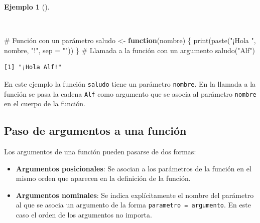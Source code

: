 \documentclass[
  a4paper,
]{scrreport}
\newenvironment{Shaded}{\begin{snugshade}}{\end{snugshade}}
\newcommand{\AttributeTok}[1]{\textcolor[rgb]{0.40,0.45,0.13}{#1}}
\newcommand{\CommentTok}[1]{\textcolor[rgb]{0.37,0.37,0.37}{#1}}
\newcommand{\ControlFlowTok}[1]{\textcolor[rgb]{0.00,0.23,0.31}{\textbf{#1}}}
\newcommand{\FunctionTok}[1]{\textcolor[rgb]{0.28,0.35,0.67}{#1}}
\newcommand{\NormalTok}[1]{\textcolor[rgb]{0.00,0.23,0.31}{#1}}
\newcommand{\OtherTok}[1]{\textcolor[rgb]{0.00,0.23,0.31}{#1}}
\newcommand{\StringTok}[1]{\textcolor[rgb]{0.13,0.47,0.30}{#1}}
\providecommand{\tightlist}{%
  \setlength{\itemsep}{0pt}\setlength{\parskip}{0pt}}\usepackage{longtable,booktabs,array}
\theoremstyle{definition}
\theoremstyle{definition}
\newtheorem{example}{Ejemplo}[chapter]
\theoremstyle{remark}
\begin{document}
\begin{example}[]\protect\hypertarget{exm-funcion-con-parametros}{}\label{exm-funcion-con-parametros}

~

\begin{Shaded}
\begin{Highlighting}[]
\CommentTok{\# Función con un parámetro}
\NormalTok{saludo }\OtherTok{\textless{}{-}} \ControlFlowTok{function}\NormalTok{(nombre) \{}
  \FunctionTok{print}\NormalTok{(}\FunctionTok{paste}\NormalTok{(}\StringTok{"¡Hola "}\NormalTok{, nombre, }\StringTok{"!"}\NormalTok{, }\AttributeTok{sep =} \StringTok{""}\NormalTok{))}
\NormalTok{\}}
\CommentTok{\# Llamada a la función con un argumento}
\FunctionTok{saludo}\NormalTok{(}\StringTok{"Alf"}\NormalTok{)}
\end{Highlighting}
\end{Shaded}

\begin{verbatim}
[1] "¡Hola Alf!"
\end{verbatim}

En este ejemplo la función \texttt{saludo} tiene un parámetro
\texttt{nombre}. En la llamada a la función se pasa la cadena
\texttt{Alf} como argumento que se asocia al parámetro \texttt{nombre}
en el cuerpo de la función.

\end{example}

\subsection{Paso de argumentos a una
función}\label{paso-de-argumentos-a-una-funciuxf3n}

Los argumentos de una función pueden pasarse de dos formas:

\begin{itemize}
\tightlist
\item
  \textbf{Argumentos posicionales}: Se asocian a los parámetros de la
  función en el mismo orden que aparecen en la definición de la función.
\item
  \textbf{Argumentos nominales}: Se indica explícitamente el nombre del
  parámetro al que se asocia un argumento de la forma
  \texttt{parametro\ =\ argumento}. En este caso el orden de los
  argumentos no importa.
\end{itemize}
\end{document}
